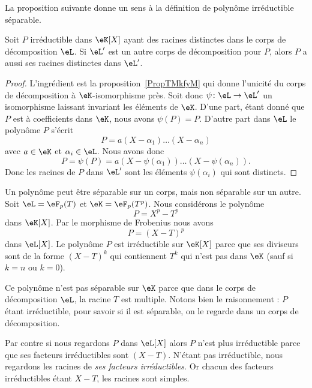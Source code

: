 La proposition suivante donne un sens à la définition de polynôme irréductible séparable.
\begin{proposition}
    Soit \( P\) irréductible dans \( \eK[X]\) ayant des racines distinctes dans le corps de décomposition \( \eL\). Si \( \eL'\) est un autre corps de décomposition pour \( P\), alors \( P\) a aussi ses racines distinctes dans \( \eL'\).
\end{proposition}

\begin{proof}
    L'ingrédient est la proposition~\ref{PropTMkfyM} qui donne l'unicité du corps de décomposition à \( \eK\)-isomorphisme près. Soit donc \( \psi\colon \eL\to \eL'\) un isomorphisme laissant invariant les éléments de \( \eK\). D'une part, étant donné que \( P\) est à coefficients dans \( \eK\), nous avons \( \psi(P)=P\). D'autre part dans \( \eL\) le polynôme \( P\) s'écrit
    \begin{equation}
        P=a(X-\alpha_1)\ldots (X-\alpha_n)
    \end{equation}
    avec \( a\in \eK\) et \( \alpha_i\in \eL\). Nous avons donc
    \begin{equation}
        P=\psi(P)=a(X-\psi(\alpha_1))\ldots (X-\psi(\alpha_n)).
    \end{equation}
    Donc les racines de \( P\) dans \( \eL'\) sont les éléments \( \psi(\alpha_i)\) qui sont distincts.
\end{proof}

\begin{example}
    Un polynôme peut être séparable sur un corps, mais non séparable sur un autre. Soit \( \eL=\eF_p(T)\) et \( \eK=\eF_p(T^p)\). Nous considérons le polynôme
    \begin{equation}
        P=X^p-T^p
    \end{equation}
    dans \( \eK[X]\). Par le morphisme de Frobenius nous avons
    \begin{equation}
        P=(X-T)^p
    \end{equation}
    dans \( \eL[X]\). Le polynôme \( P\) est irréductible sur \( \eK[X]\) parce que ses diviseurs sont de la forme \( (X-T)^k\) qui contiennent \( T^k\) qui n'est pas dans \( \eK\) (sauf si \( k=n\) ou \( k=0\)).

    Ce polynôme n'est pas séparable sur \( \eK\) parce que dans le corps de décomposition \( \eL\), la racine \( T\) est multiple. Notons bien le raisonnement : \( P\) étant irréductible, pour savoir si il est séparable, on le regarde dans un corps de décomposition.

    Par contre si nous regardons \( P\) dans \( \eL[X]\) alors \( P\) n'est plus irréductible parce que ses facteurs irréductibles sont \( (X-T)\). N'étant pas irréductible, nous regardons les racines de \emph{ses facteurs irréductibles}. Or chacun des facteurs irréductibles étant \( X-T\), les racines sont simples.
\end{example}

